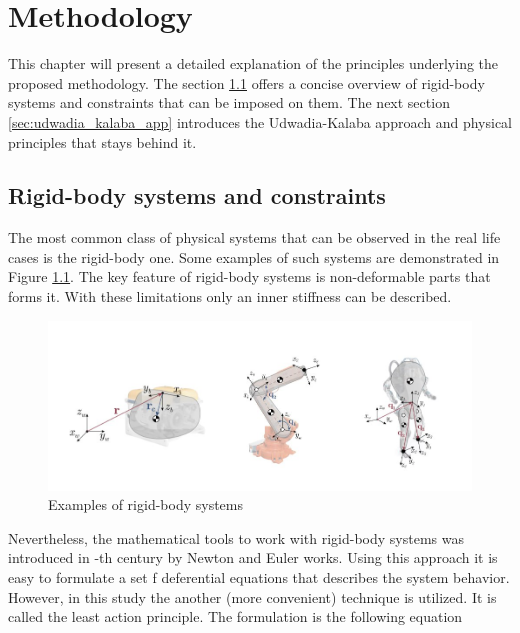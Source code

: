 \chapter{Methodology}
\label{chap:met}

This chapter will present a detailed explanation of the principles underlying the 
proposed methodology. The section \ref{sec:rigid_body_and_const} offers a concise 
overview of rigid-body systems and constraints that can be imposed on them.
The next section \ref{sec:udwadia_kalaba_app} introduces the Udwadia-Kalaba 
approach and physical principles that stays behind it.

\section{Rigid-body systems and constraints} 
\label{sec:rigid_body_and_const}

The most common class of physical systems that can be observed in the real life 
cases is the rigid-body one. Some examples of such systems are demonstrated in 
Figure \ref{fig:examples_of_rig_sys}. The key feature of rigid-body systems 
is non-deformable parts that forms it. With these limitations only an 
inner stiffness can be described.

\begin{figure}[H]
    \centering
    \includegraphics[scale=0.5]{figs/rigid_body_systems.png}
    \caption{Examples of rigid-body systems}
    \label{fig:examples_of_rig_sys}
\end{figure}


Nevertheless, the mathematical tools to work with rigid-body systems was introduced 
in -th century by Newton and Euler works. Using this approach it is easy 
to formulate a set f deferential equations that describes the system behavior.
However, in this study the another (more convenient) technique is utilized. It is 
called the least action principle. The formulation is the following equation


